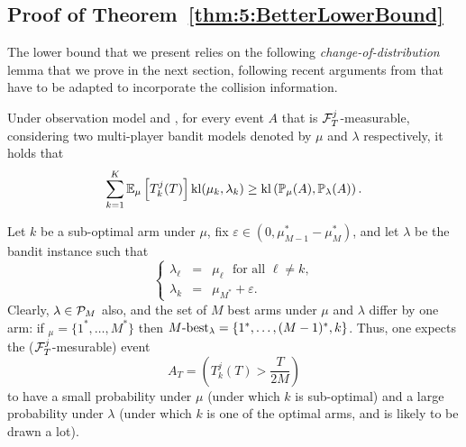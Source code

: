 \subsection{Proof of Theorem~\ref{thm:5:BetterLowerBound}}

The lower bound that we present relies on the following \emph{change-of-distribution} lemma that we prove in the next section, following recent arguments from \cite{Garivier16TrueShape} that have to be adapted to incorporate the collision information.


\begin{lemma}\label{lem:5:CD} Under observation model \modelun{} and \modeldeux, for every event $A$ that is $\mathcal{F}_{T}^{j}$-measurable, considering two multi-player bandit models denoted by $\mu$ and $\lambda$ respectively, it holds that
\begin{equation}
  \sum_{k=1}^{K}\mathbb{E}_{\mu}\left[T_k^j(T)\right]\mathrm{kl}(\mu_k,\lambda_k) \geq \mathrm{kl} \left(\mathbb{P}_{\mu}(A),\mathbb{P}_{\lambda}(A)\right).
\end{equation}
\end{lemma}

Let $k$ be a sub-optimal arm under $\mu$,
fix $\varepsilon \in \left(0, \mu_{M-1}^* - \mu_M^*\right)$,
and let $\lambda$ be the bandit instance such that
\[\left\{\begin{array}{ccl}
          \lambda_\ell & = & \mu_\ell \ \ \  \text{for all } \ell \neq k, \\
          \lambda_k & = & \mu_{M^*} + \varepsilon.
         \end{array}
\right.\]
Clearly, $\lambda\in\mathcal{P}_M$ also,
and the set of $M$ best arms under $\mu$ and $\lambda$ differ by one arm: if \Mbest$_{\mu} = \{1^*,\dots,M^*\}$ then $M\text{-}\mathrm{best}_{\lambda} = \{1^*,\dots,(M-1)^*,k\}$.
Thus, one expects the ($\mathcal{F}^j_T$-mesurable) event
\[A_T = \left(T_k^j(T) > \frac{T}{2M}\right)\]
to have a small probability under $\mu$ (under which $k$ is sub-optimal) and a large probability under $\lambda$ (under which $k$ is one of the optimal arms, and is likely to be drawn a lot).

